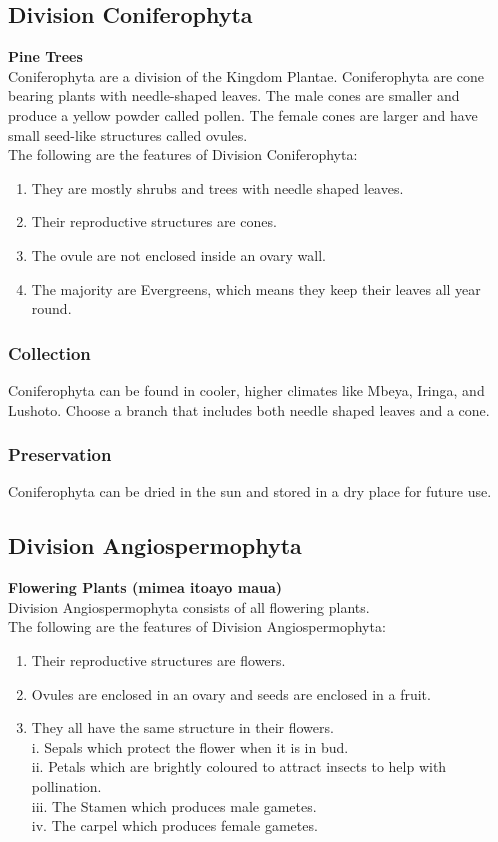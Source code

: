 \subsection{Division Coniferophyta}
\textbf{Pine Trees}\\
 Coniferophyta are a division of the Kingdom Plantae. Coniferophyta are cone bearing plants with needle-shaped leaves. The male cones are smaller and produce a yellow powder called pollen. The female cones are larger and have small seed-like structures called ovules.\\
The following are the features of Division Coniferophyta:
\begin{enumerate}
\item{They are mostly shrubs and trees with needle shaped leaves.}
\item{Their reproductive structures are cones.}
\item{The ovule are not enclosed inside an ovary wall.}
\item{The majority are Evergreens, which means they keep their leaves all year round.}
\end{enumerate}

\subsubsection{Collection}
Coniferophyta can be found in cooler, higher climates like Mbeya, Iringa, and Lushoto. Choose a branch that includes both needle shaped leaves and a cone.

\subsubsection*{Preservation} 
Coniferophyta can be dried in the sun and stored in a dry place for future use.

\subsection{Division Angiospermophyta}
\textbf{Flowering Plants (mimea itoayo maua)}\\ 
Division Angiospermophyta consists of all flowering plants. \\
The following are the features of Division Angiospermophyta:
\begin{enumerate}
\item{Their reproductive structures are flowers.} 
\item{Ovules are enclosed in an ovary and seeds are enclosed in a fruit.}
\item{They all have the same structure in their flowers.\\
i.	Sepals which protect the flower when it is in bud.\\
ii.	Petals which are brightly coloured to attract insects to help with pollination.\\
iii.	The Stamen which produces male gametes.\\
iv.	The carpel which produces female gametes.}
\end{enumerate}


